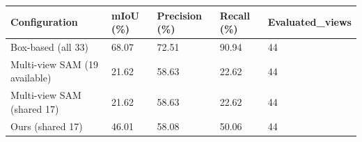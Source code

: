 \begin{tabular}{lllll}
\hline
Configuration & mIoU (\%) & Precision (\%) & Recall (\%) & Evaluated\_views \\
\hline
Box-based (all 33) & 68.07 & 72.51 & 90.94 & 44 \\
Multi-view SAM (19 available) & 21.62 & 58.63 & 22.62 & 44 \\
Multi-view SAM (shared 17) & 21.62 & 58.63 & 22.62 & 44 \\
Ours (shared 17) & 46.01 & 58.08 & 50.06 & 44 \\
\hline
\end{tabular}
